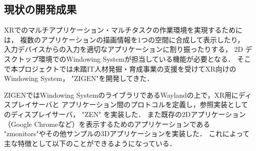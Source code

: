 \subsection{現状の開発成果}
\label{section:current-status}

XRでのマルチアプリケーション・マルチタスクの作業環境を実現するためには，
複数のアプリケーションの描画情報を1つの空間に合成して表示したり，
入力デバイスからの入力を適切なアプリケーションに割り振ったりする，
2D デスクトップ環境でのWindowing Systemが担当している機能が必要となる．
そこで本プロジェクトでは未踏IT人材発掘・育成事業の支援を受けてXR向けのWindowing System，
"ZIGEN"を開発してきた．

ZIGENではWindowing SystemのライブラリであるWaylandの上で，XR用にディスプレイサーバと
アプリケーション間のプロトコルを定義し，参照実装としてのディスプレイサーバ， "ZEN" を実装した．
また既存の2Dアプリケーション（Google Chromeなど）を表示するためのアプリケーションである
"zmonitors"やその他サンプルの3Dアプリケーションを実装した．
これによって主な特徴として以下のことができるようになっている．

